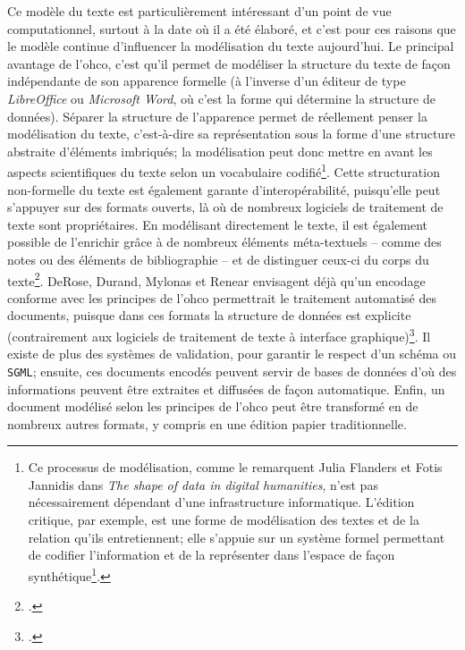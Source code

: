 Ce modèle du texte est particulièrement intéressant d'un point de vue computationnel, surtout à la date où il a été élaboré, et c'est pour ces raisons que le modèle continue d'influencer la modélisation du texte aujourd'hui. Le principal avantage de l'\gls{ohco}, c'est qu'il permet de modéliser la structure du texte de façon indépendante de son apparence formelle (à l'inverse d'un éditeur de type \textit{LibreOffice} ou \textit{Microsoft Word}, où c'est la forme qui détermine la structure de données). Séparer la structure de l'apparence permet de réellement penser la modélisation du texte, c'est-à-dire sa représentation sous la forme d'une structure abstraite d'éléments imbriqués; la modélisation peut donc mettre en avant les aspects scientifiques du texte selon un vocabulaire codifié\footnote{
	Ce processus de modélisation, comme le remarquent Julia Flanders et Fotis Jannidis dans \textit{The shape of data in digital humanities}, n'est pas nécessairement dépendant d'une infrastructure informatique. L'édition critique, par exemple, est une forme de modélisation des textes et de la relation qu'ils entretiennent; elle s'appuie sur un système formel permettant de codifier l'information et de la représenter dans l'espace de façon synthétique\footcite[p. 3-4]{flanders_data_2019}.
}. Cette structuration non-formelle du texte est également garante d'interopérabilité, puisqu'elle peut s'appuyer sur des formats ouverts, là où de nombreux logiciels de traitement de texte sont propriétaires. En modélisant directement le texte, il est également possible de l'enrichir grâce à de nombreux éléments méta-textuels -- comme des notes ou des éléments de bibliographie -- et de distinguer ceux-ci du corps du texte\footcite[p. 11-13]{derose_what_1990}. DeRose, Durand, Mylonas et Renear envisagent déjà qu'un encodage conforme avec les principes de l'\gls{ohco} permettrait le traitement automatisé des documents, puisque dans ces formats la structure de données est explicite (contrairement aux logiciels de traitement de texte à interface graphique)\footcite[p. 17-18]{derose_what_1990}. Il existe de plus des systèmes de validation, pour garantir le respect d'un schéma \xml{} ou \texttt{SGML}; ensuite, ces documents encodés peuvent servir de bases de données d'où des informations peuvent être extraites et diffusées de façon automatique. Enfin, un document modélisé selon les principes de l'\gls{ohco} peut être transformé en de nombreux autres formats, y compris en une édition papier traditionnelle.

